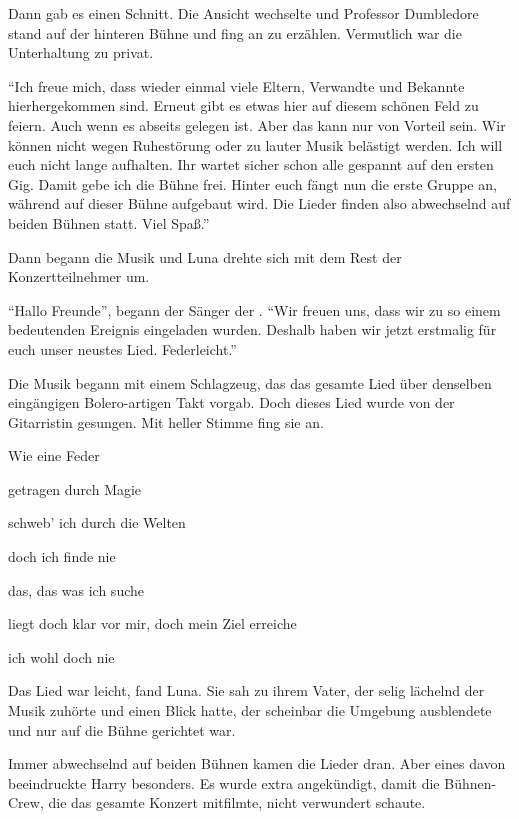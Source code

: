 Dann gab es einen Schnitt. Die Ansicht wechselte und Professor Dumbledore stand auf der hinteren Bühne und fing an zu erzählen. Vermutlich war die Unterhaltung zu privat.

\begin{rueckblick}
\enquote{Ich freue mich, dass wieder einmal viele Eltern, Verwandte und Bekannte hierhergekommen sind. Erneut gibt es etwas hier auf diesem schönen Feld zu feiern. Auch wenn es abseits gelegen ist. Aber das kann nur von Vorteil sein. Wir können nicht wegen Ruhestörung oder zu lauter Musik belästigt werden. Ich will euch nicht lange aufhalten. Ihr wartet sicher schon alle gespannt auf den ersten Gig. Damit gebe ich die Bühne frei. Hinter euch fängt nun die erste Gruppe an, während auf dieser Bühne aufgebaut wird. Die Lieder finden also abwechselnd auf beiden Bühnen statt. Viel Spaß.}

Dann begann die Musik und Luna drehte sich mit dem Rest der Konzertteilnehmer um.

\enquote{Hallo Freunde}, begann der Sänger der . \enquote{Wir freuen uns, dass wir zu so einem bedeutenden Ereignis eingeladen wurden. Deshalb haben wir jetzt erstmalig für euch unser neustes Lied. \gst Federleicht.}

Die Musik begann mit einem Schlagzeug, das das gesamte Lied über denselben eingängigen Bolero-artigen Takt vorgab. Doch dieses Lied wurde von der Gitarristin gesungen. Mit heller Stimme fing sie an.

\begin{lied}
Wie eine Feder

getragen durch Magie

schweb’ ich durch die Welten

doch ich finde nie

das, das was ich suche

liegt doch klar vor mir, doch mein Ziel erreiche

ich wohl doch nie\abs
\end{lied}

Das Lied war leicht, fand Luna. Sie sah zu ihrem Vater, der selig lächelnd der Musik zuhörte und einen Blick hatte, der scheinbar die Umgebung ausblendete und nur auf die Bühne gerichtet war.
\end{rueckblick}

Immer abwechselnd auf beiden Bühnen kamen die Lieder dran. Aber eines davon beeindruckte Harry besonders. Es wurde extra angekündigt, damit die Bühnen-Crew, die das gesamte Konzert mitfilmte, nicht verwundert schaute.

